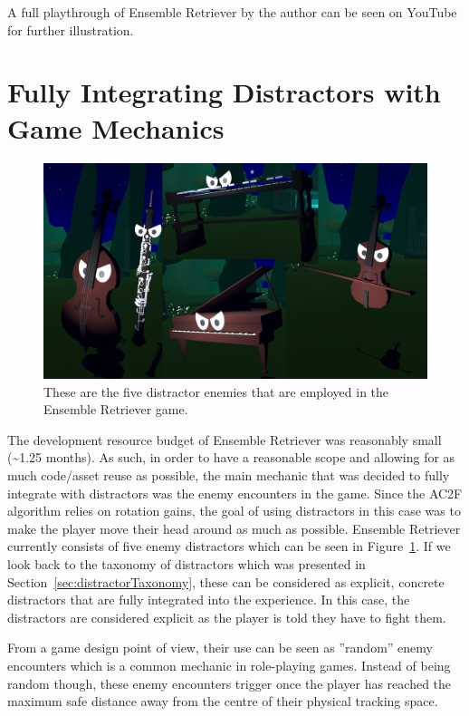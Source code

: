 A full playthrough of Ensemble Retriever by the author can be seen on YouTube~\cite{ERPlaythrough} for further illustration.

\section{Fully Integrating Distractors with Game Mechanics}
\begin{figure}[tbph]
    \centering
    \includegraphics[width=1\textwidth]{figures/screenshots/Distractors.png}
    \caption[The Distractors of Ensemble Retriever]{These are the five distractor enemies that are employed in the Ensemble Retriever game.}
    \label{fig:allDistractors}
\end{figure}

The development resource budget of Ensemble Retriever was reasonably small (\textasciitilde1.25 months). As such, in order to have a reasonable scope and allowing for as much code/asset reuse as possible, the main mechanic that was decided to fully integrate with distractors was the enemy encounters in the game. Since the AC2F algorithm relies on rotation gains, the goal of using distractors in this case was to make the player move their head around as much as possible. Ensemble Retriever currently consists of five enemy distractors which can be seen in Figure~\ref{fig:allDistractors}. If we look back to the taxonomy of distractors which was presented in Section~\ref{sec:distractorTaxonomy}, these can be considered as explicit, concrete distractors that are fully integrated into the experience. In this case, the distractors are considered explicit as the player is told they have to fight them. 

From a game design point of view, their use can be seen as ''random'' enemy encounters which is a common mechanic in role-playing games. Instead of being random though, these enemy encounters trigger once the player has reached the maximum safe distance away from the centre of their physical tracking space. 

